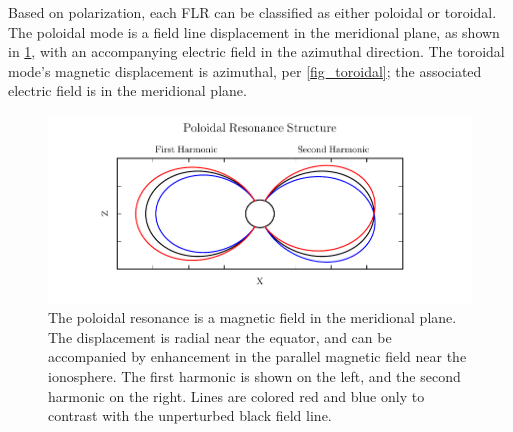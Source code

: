 
Based on polarization, each FLR can be classified as either poloidal or
toroidal. The poloidal mode is a field line displacement in the meridional
plane, as shown in \cref{fig_poloidal}, with an accompanying electric field in
the azimuthal direction. The toroidal mode's magnetic displacement is
azimuthal, per \cref{fig_toroidal}; the associated electric field is in the
meridional plane. 

\begin{figure}[!htb]
  \centering
  \includegraphics[width=\textwidth]{figures/poloidal.pdf}
  \caption[Poloidal Mode Structure]{
    The poloidal resonance is a magnetic field in the meridional plane. The
    displacement is radial near the equator, and can be accompanied by
    enhancement in the parallel magnetic field near the ionosphere. The first
    harmonic is shown on the left, and the second harmonic on the right. Lines
    are colored red and blue only to contrast with the unperturbed black field
    line. 
  }
  \label{fig_poloidal}
\end{figure}

